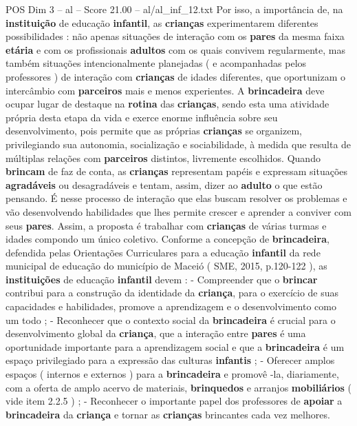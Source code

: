 \begin{textsample}{POS Dim 3 – al – Score 21.00 – al/al\_inf\_12.txt}
Por isso, a importância de, na \textbf{instituição} de educação \textbf{infantil}, as \textbf{crianças} experimentarem diferentes possibilidades : não apenas situações de interação com os \textbf{pares} da mesma faixa \textbf{etária} e com os profissionais \textbf{adultos} com os quais convivem regularmente, mas também situações intencionalmente planejadas ( e acompanhadas pelos professores ) de interação com \textbf{crianças} de idades diferentes, que oportunizam o intercâmbio com \textbf{parceiros} mais e menos experientes.
A \textbf{brincadeira} deve ocupar lugar de destaque na \textbf{rotina} das \textbf{crianças}, sendo esta uma atividade própria desta etapa da vida e exerce enorme influência sobre seu desenvolvimento, pois permite que as próprias \textbf{crianças} se organizem, privilegiando sua autonomia, socialização e sociabilidade, à medida que resulta de múltiplas relações com \textbf{parceiros} distintos, livremente escolhidos.
Quando \textbf{brincam} de faz de conta, as \textbf{crianças} representam papéis e expressam situações \textbf{agradáveis} ou desagradáveis e tentam, assim, dizer ao \textbf{adulto} o que estão pensando.
É nesse processo de interação que elas buscam resolver os problemas e vão desenvolvendo habilidades que lhes permite crescer e aprender a conviver com seus \textbf{pares}.
Assim, a proposta é trabalhar com \textbf{crianças} de várias turmas e idades compondo um único coletivo.
Conforme a concepção de \textbf{brincadeira}, defendida pelas Orientações Curriculares para a educação \textbf{infantil} da rede municipal de educação do município de Maceió ( SME, 2015, p.120-122 ), as \textbf{instituições} de educação \textbf{infantil} devem : - Compreender que o \textbf{brincar} contribui para a construção da identidade da \textbf{criança}, para o exercício de suas capacidades e habilidades, promove a aprendizagem e o desenvolvimento como um todo ; - Reconhecer que o contexto social da \textbf{brincadeira} é crucial para o desenvolvimento global da \textbf{criança}, que a interação entre \textbf{pares} é uma oportunidade importante para a aprendizagem social e que a \textbf{brincadeira} é um espaço privilegiado para a expressão das culturas \textbf{infantis} ; - Oferecer amplos espaços ( internos e externos ) para a \textbf{brincadeira} e promovê -la, diariamente, com a oferta de amplo acervo de materiais, \textbf{brinquedos} e arranjos \textbf{mobiliários} ( vide item 2.2.5 ) ; - Reconhecer o importante papel dos professores de \textbf{apoiar} a \textbf{brincadeira} da \textbf{criança} e tornar as \textbf{crianças} brincantes cada vez melhores.

\end{textsample}

